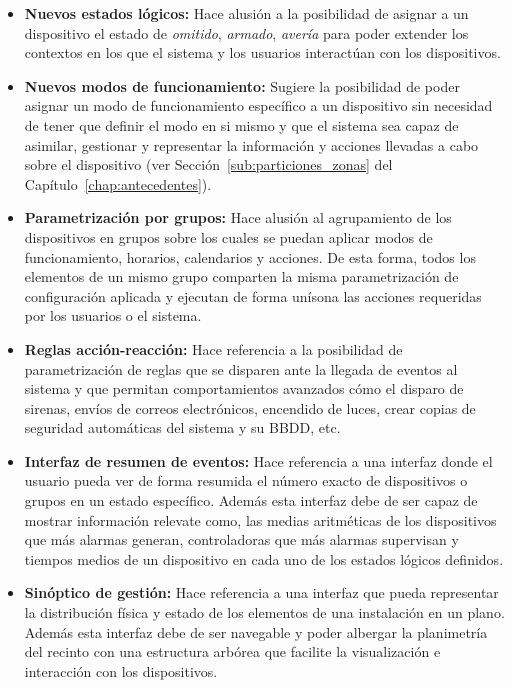 \begin{itemize}

\item \textbf{Nuevos estados lógicos:} Hace alusión a la posibilidad de asignar a un dispositivo el estado de \textit{omitido}, \textit{armado}, \textit{avería} para poder extender los contextos en los que el sistema y los usuarios interactúan con los dispositivos.

\item \textbf{Nuevos modos de funcionamiento:} Sugiere la posibilidad de poder asignar un modo de funcionamiento específico a un dispositivo sin necesidad de tener que definir el modo en si mismo y que el sistema sea capaz de asimilar, gestionar y representar la información y acciones llevadas a cabo sobre el dispositivo (ver Sección~\ref{sub:particiones_zonas} del Capítulo~\ref{chap:antecedentes}).  

\item \textbf{Parametrización por grupos:} Hace alusión al agrupamiento de los dispositivos en grupos sobre los cuales se puedan aplicar modos de funcionamiento, horarios, calendarios y acciones. De esta forma, todos los elementos de un mismo grupo comparten la misma parametrización de configuración aplicada y ejecutan de forma unísona las acciones requeridas por los usuarios o el sistema.

\item \textbf{Reglas acción-reacción:} Hace referencia a la posibilidad de parametrización de reglas que se disparen ante la llegada de eventos al sistema y que permitan comportamientos avanzados cómo el disparo de sirenas, envíos de correos electrónicos, encendido de luces, crear copias de seguridad automáticas del sistema y su \acs{BBDD}, etc.

\item \textbf{Interfaz de resumen de eventos:} Hace referencia a una interfaz donde el usuario pueda ver de forma resumida el número exacto de dispositivos o grupos en un estado específico. Además esta interfaz debe de ser capaz de mostrar información relevate como, las medias aritméticas de los dispositivos que más alarmas generan, controladoras que más alarmas supervisan y tiempos medios de un dispositivo en cada uno de los estados lógicos definidos.

\item \textbf{Sinóptico de gestión:} Hace referencia a una interfaz que pueda representar la distribución física y estado de los elementos de una instalación en un plano. Además esta interfaz debe de ser navegable y poder albergar la planimetría del recinto con una estructura arbórea que facilite la visualización e interacción con los dispositivos.

\end{itemize}
